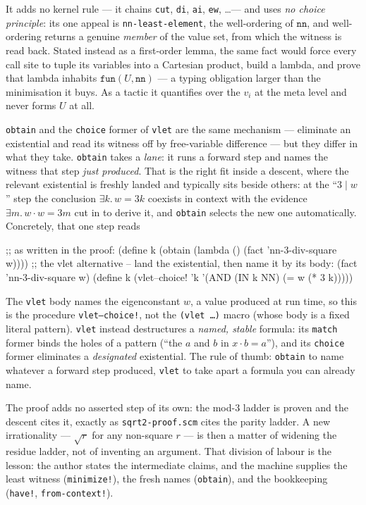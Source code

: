 \begin{remark}
It adds no kernel rule --- it chains \texttt{cut}, \texttt{di}, \texttt{ai},
\texttt{ew}, \ldots --- and uses \emph{no choice principle}: its one appeal is
\texttt{nn-least-element}, the well-ordering of $\mathtt{nn}$, and well-ordering
returns a genuine \emph{member} of the value set, from which the witness is read
back.  Stated instead as a first-order lemma, the same fact would force every
call site to tuple its variables into a Cartesian product, build a lambda, and
prove that lambda inhabits $\mathtt{fun}(U,\mathtt{nn})$ --- a typing obligation
larger than the minimisation it buys.  As a tactic it quantifies over the $v_i$
at the meta level and never forms $U$ at all.
\end{remark}

\begin{remark}
\texttt{obtain} and the \texttt{choice} former of \texttt{vlet} are the same
mechanism --- eliminate an existential and read its witness off by
free-variable difference --- but they differ in what they take.  \texttt{obtain}
takes a \emph{lane}: it runs a forward step and names the witness that step
\emph{just produced}.  That is the right fit inside a descent, where the relevant
existential is freshly landed and typically sits beside others: at the
``$3 \mid w$'' step the conclusion $\exists k.\,w = 3k$ coexists in context with
the evidence $\exists m.\,w\cdot w = 3m$ cut in to derive it, and \texttt{obtain}
selects the new one automatically.  Concretely, that one step reads
\begin{VNBsnip}
;; as written in the proof:
(define k (obtain (lambda () (fact 'nn-3-div-square w))))
;; the vlet alternative -- land the existential, then name it by its body:
(fact 'nn-3-div-square w)
(define k (vlet--choice! 'k '(AND (IN k NN) (= w (* 3 k)))))
\end{VNBsnip}
The \texttt{vlet} body names the eigenconstant $w$, a value produced at run
time, so this is the procedure \texttt{vlet--choice!}, not the
\texttt{(vlet \ldots)} macro (whose body is a fixed literal pattern).
\texttt{vlet} instead destructures a
\emph{named, stable} formula: its \texttt{match} former binds the holes of a
pattern (``the $a$ and $b$ in $x\cdot b = a$''), and its \texttt{choice} former
eliminates a \emph{designated} existential.  The rule of thumb: \texttt{obtain}
to name whatever a forward step produced, \texttt{vlet} to take apart a formula
you can already name.
\end{remark}

\begin{remark}
The proof adds no asserted step of its own: the mod-$3$ ladder is proven and the
descent cites it, exactly as \texttt{sqrt2-proof.scm} cites the parity ladder.
A new irrationality --- $\sqrt r$ for any non-square $r$ --- is then a matter of
widening the residue ladder, not of inventing an argument.  That division of
labour is the lesson: the author states the intermediate claims, and the machine
supplies the least witness (\texttt{minimize!}), the fresh names
(\texttt{obtain}), and the bookkeeping (\texttt{have!}, \texttt{from-context!}).
\end{remark}

